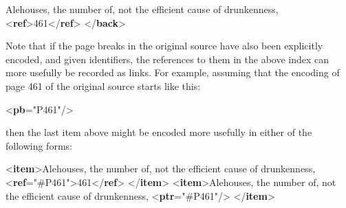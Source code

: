 \begin{shaded}
\hspace*{1em}\hspace*{1em}\mbox{}\newline 
\hspace*{1em}\hspace*{1em}Alehouses, the number of, not the efficient cause of drunkenness, {<\textbf{ref}>}461{</\textbf{ref}>}\mbox{}\newline 
\hspace*{1em}\hspace*{1em}\mbox{}\newline 
\hspace*{1em}\mbox{}\newline 
{}\mbox{}\newline 
{</\textbf{back}>}\end{shaded}\egroup\par \noindent   Note that if the page breaks in the original source have also been explicitly encoded, and given identifiers, the references to them in the above index can more usefully be recorded as links. For example, assuming that the encoding of page 461 of the original source starts like this: \par\bgroup{}\exampleFont \begin{shaded}\noindent\mbox{}{<\textbf{pb}\hspace*{1em}{xml:id}="{P461}"/>}\end{shaded}\egroup\par \noindent  then the last item above might be encoded more usefully in either of the following forms: \par\bgroup{}\exampleFont \begin{shaded}\noindent\mbox{}{<\textbf{item}>}Alehouses, the number of, not\mbox{}\newline 
 the efficient cause of drunkenness, {<\textbf{ref}\hspace*{1em}{target}="{\#P461}">}461{</\textbf{ref}>}\mbox{}\newline 
{</\textbf{item}>}\mbox{}\newline 
{<\textbf{item}>}Alehouses, the number of, not the efficient cause of drunkenness, {<\textbf{ptr}\hspace*{1em}{target}="{\#P461}"/>}\mbox{}\newline 
{</\textbf{item}>}\end{shaded}\egroup\par \par
